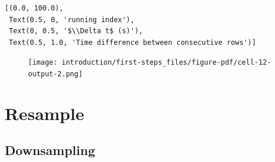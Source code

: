 \documentclass[
  letterpaper,
  DIV=11,
  numbers=noendperiod,
  oneside]{scrreprt}
\begin{document}
\begin{verbatim}
[(0.0, 100.0),
 Text(0.5, 0, 'running index'),
 Text(0, 0.5, '$\\Delta t$ (s)'),
 Text(0.5, 1.0, 'Time difference between consecutive rows')]
\end{verbatim}

\begin{figure}[H]

{\centering \texttt{[image: introduction/first-steps\_files/figure-pdf/cell-12-output-2.png]}

}

\end{figure}

\hypertarget{resample}{%
\section{Resample}\label{resample}}

\hypertarget{downsampling}{%
\subsection{Downsampling}\label{downsampling}}
\end{document}
